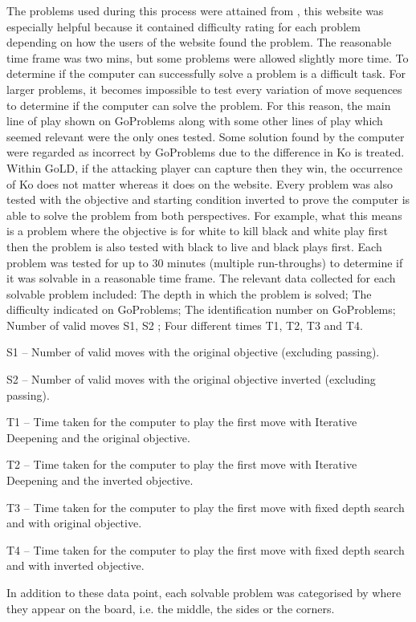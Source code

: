 \documentclass{l4proj}
\begin{document}
The problems used during this process were attained from \cite{GoProblems} , this website was especially helpful because it contained difficulty rating for each problem depending on how the users of the website found the problem. The reasonable time frame was two mins, but some problems were allowed slightly more time.
To determine if the computer can successfully solve a problem is a difficult task. For larger problems, it becomes impossible to test every variation of move sequences to determine if the computer can solve the problem. For this reason,  the main line of play shown on GoProblems along with some other lines of play which seemed relevant were the only ones tested. Some solution found by the computer were regarded as incorrect by GoProblems due to the difference in Ko is treated. Within GoLD, if the attacking player can capture then they win, the occurrence of Ko does not matter whereas it does on the website. Every problem was also tested with the objective and starting condition inverted to prove the computer is able to solve the problem from both perspectives. For example, what this means is a problem where the objective is for white to kill black and white play first then the problem is also tested with black to live and black plays first. Each problem was tested for up to 30 minutes (multiple run-throughs) to determine if it was solvable in a reasonable time frame.
The relevant data collected for each solvable problem included: The depth in which the problem is solved; The difficulty indicated on GoProblems; The identification number on GoProblems; Number of valid moves S1, S2 ; Four different times T1, T2, T3 and T4.

S1 – Number of valid moves with the original objective (excluding passing).

S2 – Number of valid moves with the original objective inverted (excluding passing).


T1 – Time taken for the computer to play the first move with Iterative Deepening and the original objective.

T2 – Time taken for the computer to play the first move with Iterative Deepening and the inverted objective.

T3 – Time taken for the computer to play the first move with fixed depth search and with original objective.

T4 – Time taken for the computer to play the first move with fixed depth search and with inverted objective.

In addition to these data point, each solvable problem was categorised by where they appear on the board, i.e. the middle, the sides or the corners.
\end{document}
